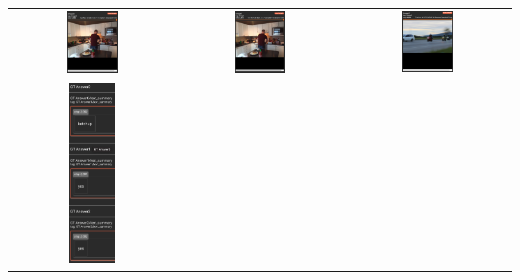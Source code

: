 \documentclass{article}
\begin{document}
\begin{tabular}{ccc}
    \includegraphics[width=0.33\textwidth]{q2.6_17.png} &
    \includegraphics[width=0.33\textwidth]{q2.6_18.png} &
    \includegraphics[width=0.33\textwidth]{q2.6_19.png} \\
    \includegraphics[width=0.3\textwidth]{q2.6_20.png} &

\end{tabular}
\end{document}
